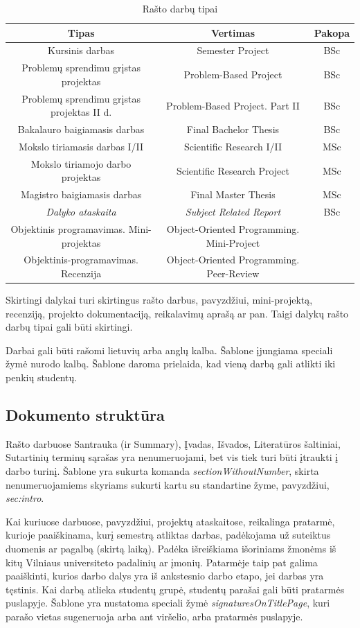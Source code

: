 \documentclass[a4paper,12pt]{article}
\begin{document}
\begin{table}[h!]\centering\small
\caption{Rašto darbų tipai}
\label{tab:typesRep}
\begin{tabular}{|c|c|c|}
\hline
Tipas&Vertimas&Pakopa\\\hline
Kursinis darbas& Semester Project& BSc\\
Problemų sprendimu grįstas projektas&Problem-Based Project&BSc\\ 
Problemų sprendimu grįstas projektas II d.&Problem-Based Project. Part II&BSc\\ 
Bakalauro baigiamasis darbas& Final Bachelor Thesis&BSc\\\hline
Mokslo tiriamasis darbas I/II&Scientific Research I/II&MSc\\
Mokslo tiriamojo darbo projektas&Scientific Research Project&MSc\\
Magistro baigiamasis darbas&Final Master Thesis&MSc\\\hline
\emph{Dalyko ataskaita} &\emph{Subject Related Report}&BSc\\
Objektinis programavimas. Mini-projektas&Object-Oriented Programming. Mini-Project&\\
Objektinis-programavimas. Recenzija&Object-Oriented Programming. Peer-Review&\\
\hline
\end{tabular}
\end{table}

Skirtingi dalykai turi skirtingus rašto darbus, pavyzdžiui,
mini-projektą, recenziją, projekto dokumentaciją, reikalavimų aprašą
ar pan. Taigi dalykų rašto darbų tipai gali būti skirtingi.

Darbai gali būti rašomi lietuvių arba anglų kalba. Šablone įjungiama
speciali žymė nurodo kalbą. Šablone daroma prielaida, kad vieną darbą
gali atlikti iki penkių studentų.

\subsection{Dokumento struktūra}
Rašto darbuose Santrauka (ir Summary), Įvadas, Išvados, Literatūros
šaltiniai, Sutartinių terminų sąrašas yra nenumeruojami, bet vis tiek
turi būti įtraukti į darbo turinį. Šablone yra sukurta komanda \emph{sectionWithoutNumber}, skirta nenumeruojamiems skyriams sukurti kartu su standartine žyme, pavyzdžiui, \emph{sec:intro}.

Kai kuriuose darbuose, pavyzdžiui, projektų ataskaitose, reikalinga
pratarmė, kurioje paaiškinama, kurį semestrą atliktas darbas,
padėkojama už suteiktus duomenis ar pagalbą (skirtą laiką). Padėka
išreiškiama išoriniams žmonėms iš kitų Vilniaus universiteto padalinių
ar įmonių. Patarmėje taip pat galima paaiškinti, kurios darbo dalys
yra iš ankstesnio darbo etapo, jei darbas yra tęstinis. Kai darbą
atlieka studentų grupė, studentų parašai gali būti pratarmės
puslapyje. Šablone yra nustatoma speciali žymė
\emph{signaturesOnTitlePage}, kuri parašo vietas sugeneruoja arba ant
viršelio, arba pratarmės puslapyje.
\end{document}
